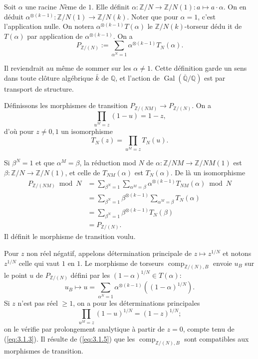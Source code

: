 \documentclass[12pt,a4paper]{article}
\theoremstyle{plain}
\theoremstyle{definition}
\theoremstyle{remark}
\DeclareMathOperator{\Gal}{Gal}
\providecommand{\Gal}{\operatorname{Gal}}
\providecommand{\comp}{\operatorname{comp}}
\begin{document}
Soit $\alpha$ une racine $N$\`eme de $1$. Elle d\'efinit $\alpha: \mathbb{Z}/N \to
\mathbb{Z}/N(1): a \mapsto a \cdot \alpha$. On en d\'eduit
$\alpha^{\otimes(k-1)}: \mathbb{Z}/N(1) \to \mathbb{Z}/N(k)$. Noter que pour
$\alpha = 1$, c'est l'application nulle. On notera
$\alpha^{\otimes(k-1)} T(\alpha)$ le $\mathbb{Z}/N(k)$-torseur d\'edu it de $T(\alpha)$ par
application de $\alpha^{\otimes(k-1)}$. On a
\begin{equation}\label{eq:3.1.2}
P_{\mathbb{Z}/(N)} := \sum_{\alpha^N=1} \alpha^{\otimes(k-1)} T_N(\alpha).
\end{equation}

Il reviendrait au m\^eme de sommer sur les $\alpha \neq 1$. Cette d\'efinition garde un
sens dans toute cl\^oture alg\'ebrique $\bar{k}$ de $\mathbb{Q}$, et l'action de
$\Gal(\overline{\mathbb{Q}}/\mathbb{Q})$ est par transport de structure.

D\'efinissons les morphismes de transition $P_{\mathbb{Z}/(NM)} \to
P_{\mathbb{Z}/(N)}$. On a
\begin{equation}\label{eq:3.1.3}
\prod_{u^M=z} (1-u) = 1-z,
\end{equation}
d'o\`u pour $z \neq 0, 1$ un isomorphisme
\begin{equation}\label{eq:3.1.4}
T_N(z) = \prod_{u^M=z} T_N(u).
\end{equation}

Si $\beta^N = 1$ et que $\alpha^M = \beta$, la r\'eduction mod $N$ de $\alpha:
\mathbb{Z}/NM \to \mathbb{Z}/NM(1)$ est $\beta: \mathbb{Z}/N \to
\mathbb{Z}/N(1)$, et celle de $T_{NM}(\alpha)$ est $T_N(\alpha)$. De l\`a un
isomorphisme
\begin{align*}
P_{\mathbb{Z}/(NM)} \bmod N &= \sum_{\beta^N=1} \sum_{\alpha^M=\beta}
\alpha^{\otimes(k-1)} T_{NM}(\alpha) \bmod N \\
&= \sum_{\beta^N=1} \beta^{\otimes(k-1)} \sum_{\alpha^M=\beta} T_N(\alpha) \\
&= \sum_{\beta^N=1} \beta^{\otimes(k-1)} T_N(\beta) \\
&= P_{\mathbb{Z}/(N)}.
\end{align*}
Il d\'efinit le morphisme de transition voulu.

Pour $z$ non r\'eel n\'egatif, appelons d\'etermination principale de $z \mapsto z^{1/N}$
et notons $z^{1/N}$ celle qui vaut $1$ en $1$. Le morphisme de torseurs
$\comp_{\mathbb{Z}/(N),B}$ envoie $u_B$ sur le point $u$ de $P_{\mathbb{Z}/(N)}$
d\'efini par les $(1-\alpha)^{1/N} \in T(\alpha)$:
\begin{equation*}
u_B \longmapsto u = \sum_{\alpha^N=1} \alpha^{\otimes(k-1)} ((1-\alpha)^{1/N}).
\end{equation*}
Si $z$ n'est pas r\'eel $\geq 1$, on a pour les d\'eterminations principales
\begin{equation}\label{eq:3.1.5}
\prod_{u^M=z} (1-u)^{1/N} = (1-z)^{1/N};
\end{equation}
on le v\'erifie par prolongement analytique \`a partir de $z = 0$, compte tenu de
(\ref{eq:3.1.3}). Il r\'esulte de (\ref{eq:3.1.5}) que les
$\comp_{\mathbb{Z}/(N),B}$ sont compatibles aux morphismes de transition.
\end{document}

